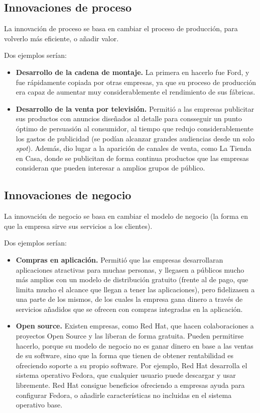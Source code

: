 \documentclass[a4paper]{article}
\begin{document}
\subsection{Innovaciones de proceso}
La innovación de proceso se basa en cambiar el proceso de producción, para volverlo más eficiente, o añadir valor.

Dos ejemplos serían:
\begin{itemize}
    \item \textbf{Desarrollo de la cadena de montaje.} La primera en hacerlo fue Ford, y fue rápidamente copiada por otras empresas, ya que su proceso de producción era capaz de aumentar muy considerablemente el rendimiento de sus fábricas.
    \item \textbf{Desarrollo de la venta por televisión.} Permitió a las empresas publicitar sus productos con anuncios diseñados al detalle para consseguir un punto óptimo de persuasión al consumidor, al tiempo que redujo considerablemente los gastos de publicidad (se podían alcanzar grandes audiencias desde un solo \textit{spot}). Además, dio lugar a la aparición de canales de venta, como La Tienda en Casa, donde se publicitan de forma continua productos que las empresas consideran que pueden interesar a amplios grupos de público.
\end{itemize}

\subsection{Innovaciones de negocio}
La innovación de negocio se basa en cambiar el modelo de negocio (la forma en que la empresa sirve sus servicios a los clientes).

Dos ejemplos serían:
\begin{itemize}
    \item \textbf{Compras en aplicación.} Permitió que las empresas desarrollaran aplicaciones atractivas para muchas personas, y llegasen a públicos mucho más amplios con un modelo de distribución gratuito (frente al de pago, que limita mucho el alcance que llegan a tener las aplicaciones), pero fidelizasen a una parte de los mismos, de los cuales la empresa gana dinero a través de servicios añadidos que se ofrecen con compras integradas en la aplicación.
    \item \textbf{Open source.} Existen empresas, como Red Hat, que hacen colaboraciones a proyectos Open Source y las liberan de forma gratuita. Pueden permitirse hacerlo, porque su modelo de negocio no es ganar dinero en base a las ventas de su software, sino que la forma que tienen de obtener rentabilidad es ofreciendo soporte a su propio software. Por ejemplo, Red Hat desarrolla el sistema operativo Fedora, que cualquier usuario puede descargar y usar libremente. Red Hat consigue beneficios ofreciendo a empresas ayuda para configurar Fedora, o añadirle características no incluidas en el sistema operativo base.
\end{itemize}
\end{document}
